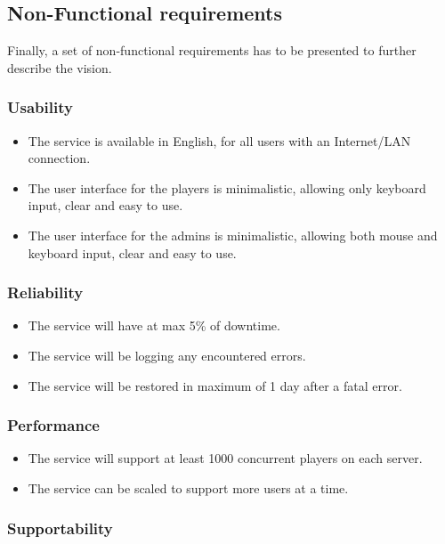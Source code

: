 \documentclass[titlepage]{article}
\begin{document}
\subsection{Non-Functional requirements}

Finally, a set of non-functional requirements has to be presented to further describe the vision.

\subsubsection{Usability}

\begin{itemize}
	\item The service is available in English, for all users with an Internet/LAN connection.
	\item The user interface for the players is minimalistic, allowing only keyboard input, clear and easy to use.
	\item The user interface for the admins is minimalistic, allowing both mouse and keyboard input, clear and easy to use.
\end{itemize}

\subsubsection{Reliability}

\begin{itemize}
	\item The service will have at max 5\% of downtime.
	\item The service will be logging any encountered errors.
	\item The service will be restored in maximum of 1 day after a fatal error.
\end{itemize}

\subsubsection{Performance}

\begin{itemize}
	\item The service will support at least 1000 concurrent players on each server.
	\item The service can be scaled to support more users at a time.
\end{itemize}

\subsubsection{Supportability}
\end{document}
